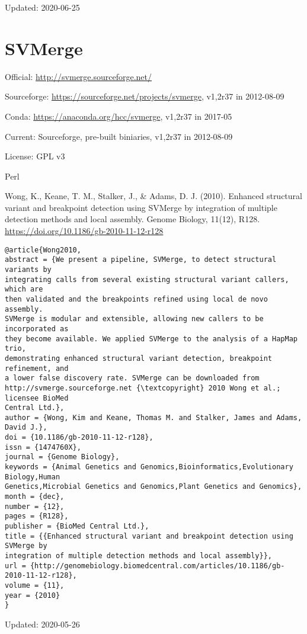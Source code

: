 \documentclass[]{article}
\begin{document}
Updated: 2020-06-25

\section{SVMerge}

Official: \url{http://svmerge.sourceforge.net/}

Sourceforge: \url{https://sourceforge.net/projects/svmerge}, v1,2r37 in 2012-08-09

Conda: \url{https://anaconda.org/hcc/svmerge}, v1,2r37 in 2017-05

Current: Sourceforge, pre-built biniaries, v1,2r37 in 2012-08-09

License: GPL v3

Perl

Wong, K., Keane, T. M., Stalker, J., \& Adams, D. J. (2010). Enhanced structural variant and breakpoint detection using SVMerge by integration of multiple detection methods and local assembly. Genome Biology, 11(12), R128. \url{https://doi.org/10.1186/gb-2010-11-12-r128}

\begin{verbatim}
@article{Wong2010,
abstract = {We present a pipeline, SVMerge, to detect structural variants by
integrating calls from several existing structural variant callers, which are
then validated and the breakpoints refined using local de novo assembly.
SVMerge is modular and extensible, allowing new callers to be incorporated as
they become available. We applied SVMerge to the analysis of a HapMap trio,
demonstrating enhanced structural variant detection, breakpoint refinement, and
a lower false discovery rate. SVMerge can be downloaded from
http://svmerge.sourceforge.net {\textcopyright} 2010 Wong et al.; licensee BioMed
Central Ltd.},
author = {Wong, Kim and Keane, Thomas M. and Stalker, James and Adams, David J.},
doi = {10.1186/gb-2010-11-12-r128},
issn = {1474760X},
journal = {Genome Biology},
keywords = {Animal Genetics and Genomics,Bioinformatics,Evolutionary Biology,Human
Genetics,Microbial Genetics and Genomics,Plant Genetics and Genomics},
month = {dec},
number = {12},
pages = {R128},
publisher = {BioMed Central Ltd.},
title = {{Enhanced structural variant and breakpoint detection using SVMerge by
integration of multiple detection methods and local assembly}},
url = {http://genomebiology.biomedcentral.com/articles/10.1186/gb-2010-11-12-r128},
volume = {11},
year = {2010}
}
\end{verbatim}

Updated: 2020-05-26
\end{document}
